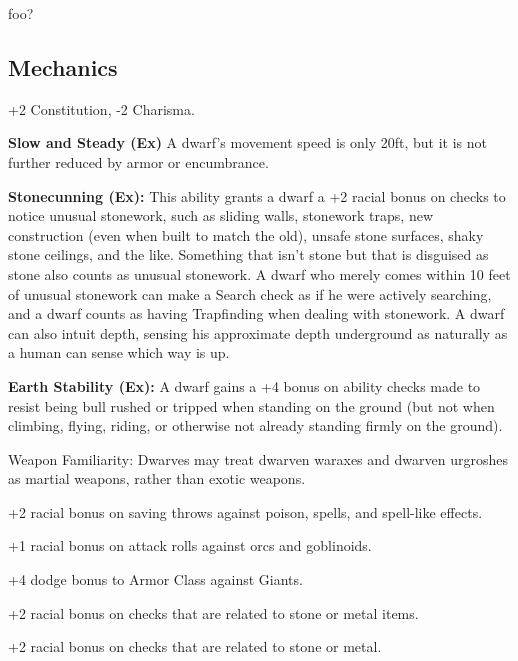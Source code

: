 
foo?

\subsection{Mechanics}

\begin{itemize*}
\item {}
\item {}
\item {}
\item {}
\item +2 Constitution, -2 Charisma.
\item \textbf{Slow and Steady (Ex)} A dwarf's movement speed is only 20ft, but it is not further reduced by armor or encumbrance.
\item \textbf{Stonecunning (Ex):} This ability grants a dwarf a +2 racial bonus on  checks to notice unusual stonework, such as sliding walls, stonework traps, new construction (even when built to match the old), unsafe stone surfaces, shaky stone ceilings, and the like. Something that isn't stone but that is disguised as stone also counts as unusual stonework. A dwarf who merely comes within 10 feet of unusual stonework can make a Search check as if he were actively searching, and a dwarf counts as having Trapfinding when dealing with stonework. A dwarf can also intuit depth, sensing his approximate depth underground as naturally as a human can sense which way is up.
\item \textbf{Earth Stability (Ex):} A dwarf gains a +4 bonus on ability checks made to resist being bull rushed or tripped when standing on the ground (but not when climbing, flying, riding, or otherwise not already standing firmly on the ground).
\item Weapon Familiarity: Dwarves may treat dwarven waraxes and dwarven urgroshes as martial weapons, rather than exotic weapons.
\item +2 racial bonus on saving throws against poison, spells, and spell-like effects.
\item +1 racial bonus on attack rolls against orcs and goblinoids.
\item +4 dodge bonus to Armor Class against Giants.
\item +2 racial bonus on  checks that are related to stone or metal items.
\item +2 racial bonus on  checks that are related to stone or metal.
\item {}
\item {}
\item {}
\end{itemize*}
